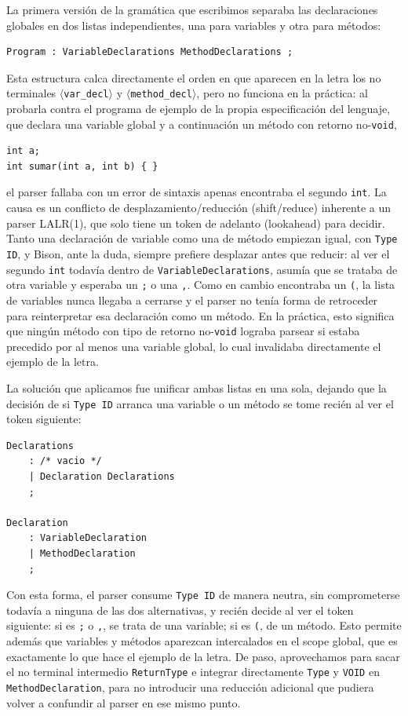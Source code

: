 \documentclass[11pt,a4paper]{article}
\begin{document}
La primera versión de la gramática que escribimos separaba las declaraciones
globales en dos listas independientes, una para variables y otra para
métodos:

\begin{verbatim}
Program : VariableDeclarations MethodDeclarations ;
\end{verbatim}

Esta estructura calca directamente el orden en que aparecen en la letra los
no terminales \texttt{$\langle$var\_decl$\rangle$} y
\texttt{$\langle$method\_decl$\rangle$}, pero no funciona en la práctica: al
probarla contra el programa de ejemplo de la propia especificación del
lenguaje, que declara una variable global y a continuación un método con
retorno no-\texttt{void},

\begin{verbatim}
int a;
int sumar(int a, int b) { }
\end{verbatim}

el parser fallaba con un error de sintaxis apenas encontraba el segundo
\texttt{int}. La causa es un conflicto de desplazamiento/reducción
(shift/reduce) inherente a un parser LALR(1), que solo tiene un token de
adelanto (lookahead) para decidir. Tanto una declaración de variable como una
de método empiezan igual, con \texttt{Type ID}, y Bison, ante la duda,
siempre prefiere desplazar antes que reducir: al ver el segundo \texttt{int}
todavía dentro de \texttt{VariableDeclarations}, asumía que se trataba de otra
variable y esperaba un \texttt{;} o una \texttt{,}. Como en cambio encontraba
un \texttt{(}, la lista de variables nunca llegaba a cerrarse y el parser no
tenía forma de retroceder para reinterpretar esa declaración como un método.
En la práctica, esto significa que ningún método con tipo de retorno
no-\texttt{void} lograba parsear si estaba precedido por al menos una
variable global, lo cual invalidaba directamente el ejemplo de la letra.

La solución que aplicamos fue unificar ambas listas en una sola, dejando que
la decisión de si \texttt{Type ID} arranca una variable o un método se tome
recién al ver el token siguiente:

\begin{verbatim}
Declarations
    : /* vacio */
    | Declaration Declarations
    ;

Declaration
    : VariableDeclaration
    | MethodDeclaration
    ;
\end{verbatim}

Con esta forma, el parser consume \texttt{Type ID} de manera neutra, sin
comprometerse todavía a ninguna de las dos alternativas, y recién decide al
ver el token siguiente: si es \texttt{;} o \texttt{,}, se trata de una
variable; si es \texttt{(}, de un método. Esto permite además que variables y
métodos aparezcan intercalados en el scope global, que es exactamente lo que
hace el ejemplo de la letra. De paso, aprovechamos para sacar el no terminal
intermedio \texttt{ReturnType} e integrar directamente \texttt{Type} y
\texttt{VOID} en \texttt{MethodDeclaration}, para no introducir una reducción
adicional que pudiera volver a confundir al parser en ese mismo punto.
\end{document}
